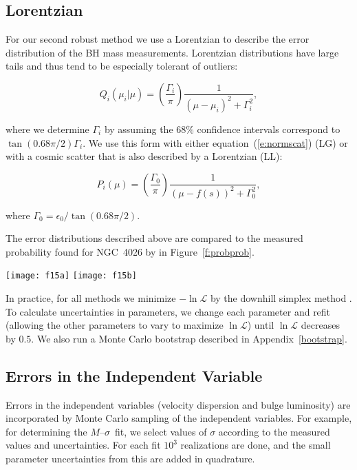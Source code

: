 \documentclass[twosided,letterpaper,numberedappendix]{emulateapj}
\newcommand{\beq}{
\begin{equation}
}
\newcommand{\eeq}{
\end{equation}
}
\newcommand{\msun}     {\ensuremath{{\rm M}_{\scriptscriptstyle \odot}}}
\newcommand{\msigma}   {\ensuremath{M}{--}\ensuremath{\sigma}}
\newcommand{\mbh}      {\ensuremath{M_{\mathrm{BH}}}}
\begin{document}
\subsection{Lorentzian}
\label{ll}
For our second robust method we use a Lorentzian to describe the
error distribution of the BH mass measurements.  Lorentzian
distributions have large tails and thus tend to be especially tolerant
of outliers:
%
\beq
Q_i(\mu_i | \mu) = \left(\frac{\Gamma_i}{\pi}\right)\frac{1}{\left(\mu - \mu_i \right)^2 + \Gamma^2_i},
\label{e:lorentzian}
\eeq
%
where we determine $\Gamma_i$ by assuming the 68\% confidence intervals correspond to $\tan{(0.68 \pi / 2)} \Gamma_i$.  We use this form
with either equation~(\ref{e:normscat}) (LG) or with a cosmic scatter
that is also described by a Lorentzian (LL):
%
\beq
P_i(\mu) = \left(\frac{\Gamma_0}{\pi}\right)\frac{1}{\left(\mu - f(s) \right)^2 + \Gamma^2_0},
\label{e:lorentzianscat}
\eeq
%
where $\Gamma_0 = \epsilon_0 / \tan{(0.68 \pi / 2)}$.  

The error distributions described above are compared to the measured
probability found for NGC~4026 by \citet{Gultekin_etal_2008} in
Figure~\ref{f:probprob}.


\begin{figure*}
\centering
\texttt{[image: f15a]}
\texttt{[image: f15b]}
\caption{Comparison of assumed error distributions with measured
probability distribution of NGC~4026 as a function of $\mbh$
(\emph{left}) and $\log{(\mbh/\msun)}$ (\emph{right}).  The measured
probability distribution comes from the $chi^2$ values from
.  The
distributions are normalized so that the integral over
$\log{(\mbh/\msun)}$ is unity.  This figure illustrates the
differences among the assumed error distributions.}
\label{f:probprob}
\end{figure*}


In practice, for all methods we minimize $-\ln{{\mathcal L}}$ by the
downhill simplex method \citep[e.g.,][]{numericalrecipes}.  To
calculate uncertainties in parameters, we change each parameter and
refit (allowing the other parameters to vary to maximize $\ln{{\mathcal L}}$)
until $\ln{{\mathcal L}}$ decreases by $0.5$.  We also run a Monte
Carlo bootstrap described in Appendix~\ref{bootstrap}.




\subsection{Errors in the Independent Variable}
\label{sigmaerrors}
Errors in the independent variables (velocity dispersion and bulge
luminosity) are incorporated by Monte Carlo sampling of the independent
variables.  For example, for determining the \msigma\ fit, we select
values of $\sigma$ according to the measured values and uncertainties.
For each fit $10^3$ realizations are done, and the small parameter
uncertainties from this are added in quadrature.
\end{document}
